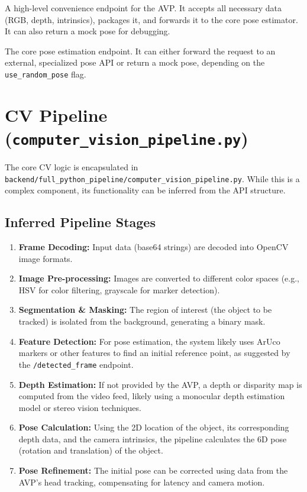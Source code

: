 ﻿\documentclass{article}
\newcommand{\filepath}[1]{\texttt{\small #1}}
\begin{document}
\begin{description}[style=multiline,leftmargin=3.5cm]
    \item[\textbf{Pose Estimation}]
    \item[\texttt{POST /avp_pose}] A high-level convenience endpoint for the AVP. It accepts all necessary data (RGB, depth, intrinsics), packages it, and forwards it to the core pose estimator. It can also return a mock pose for debugging.
    \item[\texttt{POST /pose}] The core pose estimation endpoint. It can either forward the request to an external, specialized pose API or return a mock pose, depending on the \texttt{use_random_pose} flag.
\end{description}

\section{CV Pipeline (\texttt{computer_vision_pipeline.py})}
The core CV logic is encapsulated in \filepath{backend/full_python_pipeline/computer_vision_pipeline.py}. While this is a complex component, its functionality can be inferred from the API structure.

\subsection{Inferred Pipeline Stages}
\begin{enumerate}
    \item \textbf{Frame Decoding:} Input data (base64 strings) are decoded into OpenCV image formats.
    \item \textbf{Image Pre-processing:} Images are converted to different color spaces (e.g., HSV for color filtering, grayscale for marker detection).
    \item \textbf{Segmentation & Masking:} The region of interest (the object to be tracked) is isolated from the background, generating a binary mask.
    \item \textbf{Feature Detection:} For pose estimation, the system likely uses ArUco markers or other features to find an initial reference point, as suggested by the \texttt{/detected_frame} endpoint.
    \item \textbf{Depth Estimation:} If not provided by the AVP, a depth or disparity map is computed from the video feed, likely using a monocular depth estimation model or stereo vision techniques.
    \item \textbf{Pose Calculation:} Using the 2D location of the object, its corresponding depth data, and the camera intrinsics, the pipeline calculates the 6D pose (rotation and translation) of the object.
    \item \textbf{Pose Refinement:} The initial pose can be corrected using data from the AVP's head tracking, compensating for latency and camera motion.
\end{enumerate}
\end{document}
